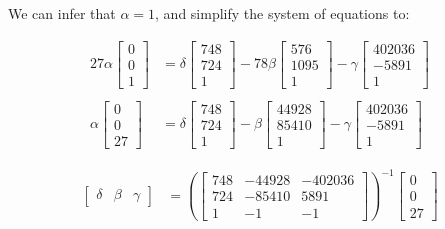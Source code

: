 \documentclass[12pt, oneside]{article}
\begin{document}
  We can infer that $\alpha = 1$, and simplify the system of equations to:
  

\begin{align*}
27\alpha  \begin{bmatrix} 0  \\ 0   \\ 1   \end{bmatrix} &= 
\delta  \begin{bmatrix} 748   \\ 724   \\  1  \end{bmatrix} -
78\beta \begin{bmatrix}
576   \\
1095   \\
1  
\end{bmatrix} - \gamma  \begin{bmatrix}
402036  \\
-5891 \\
1 
\end{bmatrix} \\ \\ %
\alpha  \begin{bmatrix}
0  \\
0   \\
27  
\end{bmatrix} &=
\delta  \begin{bmatrix}
748   \\
724   \\
1  
\end{bmatrix} -
\beta \begin{bmatrix}
44928  \\
85410   \\
1  
\end{bmatrix} - \gamma  \begin{bmatrix}
402036  \\
-5891 \\
1 
\end{bmatrix}
\end{align*} 

\begin{align*}
\begin{bmatrix}
\delta & \beta & \gamma
\end{bmatrix}  &= \left(\begin{bmatrix}
748 & -44928 & -402036   \\
724 & -85410 & 5891 \\
1   & -1     & -1	
\end{bmatrix} \right) ^{-1}
\begin{bmatrix}
0  \\
0   \\
27  
\end{bmatrix}
\end{align*} 
\end{document}
